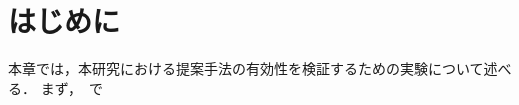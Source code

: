 \documentclass[../main]{subfiles}
\begin{document}
\section{はじめに}
\label{sec:vexp_introduction}

本章では，本研究における提案手法の有効性を検証するための実験について述べる．
まず，　で
\end{document}
